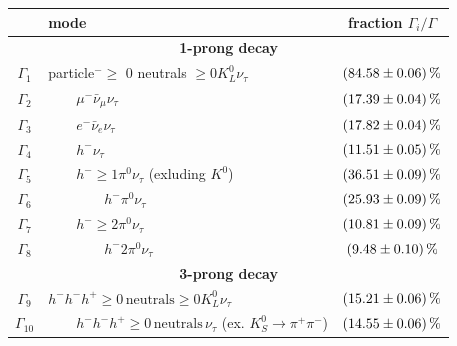 \begin{table}[htbp]
		\centering
		\begin{tabular*}{\linewidth}{@{\extracolsep{\fill}}clc}
		\hline
		\hline
		&\textbf{mode}&  \textbf{fraction }$\Gamma_i/\Gamma$
		\\
		\hline
                \multicolumn{3}{c}{\textbf{1-prong decay}}
                \\
                $\Gamma_1$       & particle$^-\geq$ 0 neutrals $\geq 0K_L^0\nu_\tau$ & $\SI[separate-uncertainty=true]{84.58\pm0.06}{\percent}$
                \\
                $\Gamma_2$       & $\qquad \mu^-\bar{\nu}_\mu\nu_\tau$               & $\SI[separate-uncertainty=true]{17.39\pm0.04}{\percent}$
                \\
                $\Gamma_3$       & $\qquad e^-\bar{\nu}_e\nu_\tau$                   & $\SI[separate-uncertainty=true]{17.82\pm0.04}{\percent}$
                \\
                $\Gamma_4$       & $\qquad h^-\nu_\tau$                             & $\SI[separate-uncertainty=true]{11.51\pm0.05}{\percent}$
                \\
                $\Gamma_5$       & $\qquad h^-\geq 1\pi^0\nu_\tau$ (exluding $K^0$)  & $\SI[separate-uncertainty=true]{36.51\pm0.09}{\percent}$
                \\
                $\Gamma_6$       & $\qquad\qquad h^-\pi^0\nu_\tau$                   & $\SI[separate-uncertainty=true]{25.93\pm0.09}{\percent}$
                \\
                $\Gamma_7$       & $\qquad h^-\geq 2\pi^0\nu_\tau$                  & $\SI[separate-uncertainty=true]{10.81\pm0.09}{\percent}$
                \\
                $\Gamma_8$       & $\qquad\qquad h^-2\pi^0\nu_\tau$                   & $\SI[separate-uncertainty=true]{9.48\pm0.10}{\percent}$
                \\
                \hline
                \multicolumn{3}{c}{\textbf{3-prong decay}}
                \\
                $\Gamma_{9}$    & $h^-h^-h^+ \geq 0\,\text{neutrals}\geq 0K_L^0\nu_\tau$ & $\SI[separate-uncertainty=true]{15.21\pm0.06}{\percent}$
                \\
                $\Gamma_{10}$    & $\qquad h^-h^-h^+ \geq 0\,\text{neutrals}\,\nu_\tau$ (ex. $K_S^0\rightarrow \pi^+\pi^-$)      & $\SI[separate-uncertainty=true]{14.55\pm0.06}{\percent}$

\end{tabular*}
\end{table}
